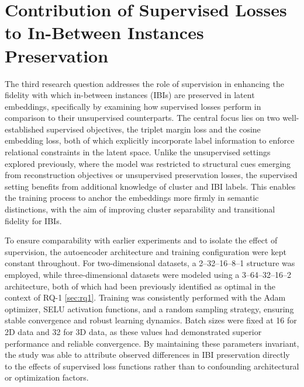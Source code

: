 \section{Contribution of Supervised Losses to In-Between Instances Preservation} \label{sec:rq3}

The third research question addresses the role of supervision in enhancing the fidelity with which in-between instances (IBIs) are preserved in latent embeddings, specifically by examining how supervised losses perform in comparison to their unsupervised counterparts. The central focus lies on two well-established supervised objectives, the triplet margin loss and the cosine embedding loss, both of which explicitly incorporate label information to enforce relational constraints in the latent space. Unlike the unsupervised settings explored previously, where the model was restricted to structural cues emerging from reconstruction objectives or unsupervised preservation losses, the supervised setting benefits from additional knowledge of cluster and IBI labels. This enables the training process to anchor the embeddings more firmly in semantic distinctions, with the aim of improving cluster separability and transitional fidelity for IBIs.

To ensure comparability with earlier experiments and to isolate the effect of supervision, the autoencoder architecture and training configuration were kept constant throughout. For two-dimensional datasets, a 2–32–16–8–1 structure was employed, while three-dimensional datasets were modeled using a 3–64–32–16–2 architecture, both of which had been previously identified as optimal in the context of RQ-1 \ref{sec:rq1}. Training was consistently performed with the Adam optimizer, SELU activation functions, and a random sampling strategy, ensuring stable convergence and robust learning dynamics. Batch sizes were fixed at 16 for 2D data and 32 for 3D data, as these values had demonstrated superior performance and reliable convergence. By maintaining these parameters invariant, the study was able to attribute observed differences in IBI preservation directly to the effects of supervised loss functions rather than to confounding architectural or optimization factors.

